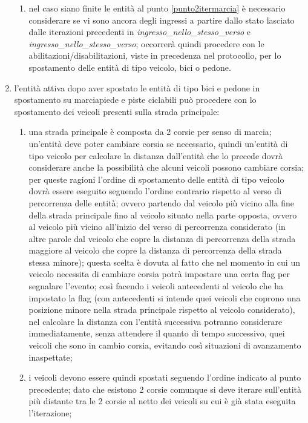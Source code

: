\begin{enumerate}
\begin{enumerate}
\item nel caso siano finite le entità al punto \ref{punto2itermarcia} è necessario considerare se vi sono ancora degli ingressi a partire dallo stato lasciato dalle iterazioni precedenti in \textit{ingres\-so\_nel\-lo\_stes\-so\_ver\-so} e \textit{ingres\-so\_nel\-lo\_stes\-so\_ver\-so}; occorrerà quindi procedere con le abilitazioni/disabilitazioni, viste in precedenza nel protocollo, per lo spostamento delle entità di tipo veicolo, bici o pedone.
\end{enumerate}
\item \label{totalcar}l'entità attiva dopo aver spostato le entità di tipo bici e pedone in spostamento su marciapiede e piste ciclabili può procedere con lo spostamento dei veicoli presenti sulla strada principale:
\begin{enumerate}
\item una strada principale è composta da 2 corsie per senso di marcia; un'entità deve poter cambiare corsia se necessario, quindi un'entità di tipo veicolo per calcolare la distanza dall'entità che lo precede dovrà considerare anche la possibilità che alcuni veicoli possono cambiare corsia; per queste ragioni l'ordine di spostamento delle entità di tipo veicolo dovrà essere eseguito seguendo l'ordine contrario rispetto al verso di percorrenza delle entità; ovvero partendo dal veicolo più vicino alla fine della strada principale fino al veicolo situato nella parte opposta, ovvero al veicolo più vicino all'inizio del verso di percorrenza considerato (in altre parole dal veicolo che copre la distanza di percorrenza della strada maggiore al veicolo che copre la distanza di percorrenza della strada stessa minore); questa scelta è dovuta al fatto che nel momento in cui un veicolo necessita di cambiare corsia potrà impostare una certa flag per segnalare l'evento; così facendo i veicoli antecedenti al veicolo che ha impostato la flag (con antecedenti si intende quei veicoli che coprono una posizione minore nella strada principale rispetto al veicolo considerato), nel calcolare la distanza con l'entità successiva potranno considerare immediatamente, senza attendere il quanto di tempo successivo, quei veicoli che sono in cambio corsia, evitando così situazioni di avanzamento inaspettate;
\item \label{punto2itercorsie}i veicoli devono essere quindi spostati seguendo l'ordine indicato al punto precedente; dato che esistono 2 corsie comunque si deve iterare sull'entità più distante tra le 2 corsie al netto dei veicoli su cui è già stata eseguita l'iterazione;

\end{enumerate}
\end{enumerate}
